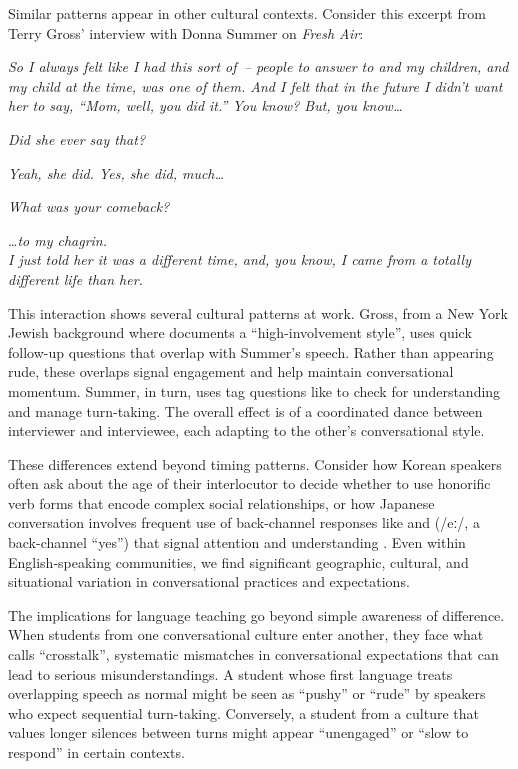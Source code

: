 Similar patterns appear in other cultural contexts. Consider this excerpt from Terry Gross' interview with Donna Summer on \textit{Fresh Air}:

\ea
\begin{dialogue}
\item[Donna Summer] \emph{So I always felt like I had this sort of~-- people to answer to and my children, and my child at the time, was one of them. And I felt that in the future I didn't want her to say, \enquote{Mom, well, you did it.} You know? But, you know\dots}
\item[Gross] \emph{Did she ever say that?}
\item[Summer] \emph{Yeah, she did. Yes, she did, much\dots}
\item[Gross] \emph{What was your comeback?}
\item[Summer] \dots\emph{to my chagrin.\\I just told her it was a different time, and, you know, I came from a totally different life than her.}
\end{dialogue}
\z
This interaction shows several cultural patterns at work. Gross, from a New York Jewish background where \citet{tannen1984} documents a \enquote{high-involvement style}, uses quick follow-up questions that overlap with Summer's speech. Rather than appearing rude, these overlaps signal engagement and help maintain conversational momentum. Summer, in turn, uses tag questions like  to check for understanding and manage turn-taking. The overall effect is of a coordinated dance between interviewer and interviewee, each adapting to the other's conversational style.

These differences extend beyond timing patterns. Consider how Korean speakers often ask about the age of their interlocutor to decide whether to use honorific verb forms that encode complex social relationships, or how Japanese conversation involves frequent use of back-channel responses like  and  (/eː/, a back-channel \enquote{yes}) that signal attention and understanding \citep{maynard1986}. Even within English-speaking communities, we find significant geographic, cultural, and situational variation in conversational practices and expectations.

The implications for language teaching go beyond simple awareness of difference. When students from one conversational culture enter another, they face what \citet{gumperz1982} calls \enquote{crosstalk}, systematic mismatches in conversational expectations that can lead to serious misunderstandings. A student whose first language treats overlapping speech as normal might be seen as \enquote{pushy} or \enquote{rude} by speakers who expect sequential turn-taking. Conversely, a student from a culture that values longer silences between turns might appear \enquote{unengaged} or \enquote{slow to respond} in certain contexts.

